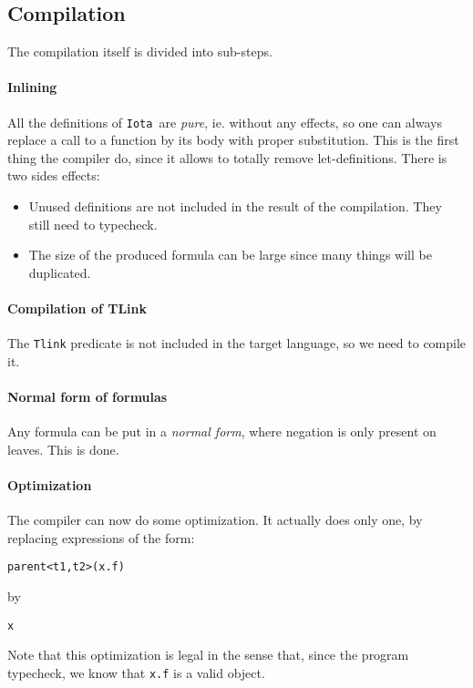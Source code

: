 \documentclass[10pt,a4paper]{article}
\newcommand{\ocaml}{\texttt}
\newcommand{\Iota}{\texttt{Iota }}
\begin{document}
\subsection{Compilation}
The compilation itself is divided into sub-steps.

\paragraph{Inlining}
All the definitions of \Iota are \emph{pure}, ie. without any effects, so one can always replace a call to a function by its body with proper substitution. This is the first thing the compiler do, since it allows to totally remove let-definitions. There is two sides effects:

\begin{itemize}
\item Unused definitions are not included in the result of the compilation. They still need to typecheck.
\item The size of the produced formula can be large since many things will be duplicated.
\end{itemize}

\paragraph{Compilation of TLink}
\label{para:tlink}
The \ocaml{Tlink} predicate is not included in the target language, so we need to compile it.

\paragraph{Normal form of formulas}
Any formula can be put in a \emph{normal form}, where negation is only present on leaves. This is done.

\paragraph{Optimization}
The compiler can now do some optimization. It actually does only one, by replacing expressions of the form:
\begin{verbatim}
parent<t1,t2>(x.f)
\end{verbatim}
by
\begin{verbatim}
x
\end{verbatim}
Note that this optimization is legal in the sense that, since the program typecheck, we know that \ocaml{x.f} is a valid object.
\end{document}
